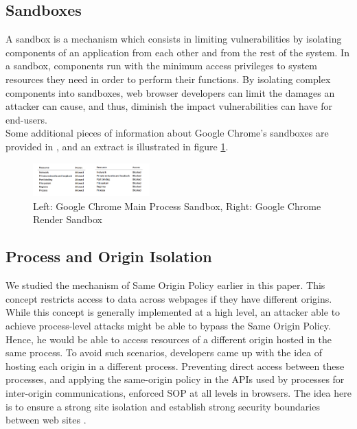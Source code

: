 \documentclass[journal]{IEEEtran}
\begin{document}
\subsection{Sandboxes}

A sandbox is a mechanism which consists in limiting vulnerabilities by isolating components of an application from each other and from the rest of the system. In a sandbox, components run with the minimum access privileges to system resources they need in order to perform their functions.
By isolating complex components into sandboxes, web browser developers can limit the damages an attacker can cause, and thus, diminish the impact vulnerabilities can have for end-users. \\

Some additional pieces of information about Google Chrome's sandboxes are provided in \cite{browserSecurityWhitePaper}, and an extract is illustrated in figure \ref{fig:ChromeSandboxes}.

\begin{figure}[h]
\centering
\includegraphics[width=0.4\textwidth]{images/SandboxesChrome.png}
\caption{Left: Google Chrome Main Process Sandbox, Right: Google Chrome Render Sandbox}
\label{fig:ChromeSandboxes}
\end{figure}

\subsection{Process and Origin Isolation}

We studied the mechanism of Same Origin Policy earlier in this paper. This concept restricts access to data across webpages if they have different origins.
While this concept is generally implemented at a high level, an attacker able to achieve process-level attacks might be able to bypass the Same Origin Policy. Hence, he would be able to access resources of a different origin hosted in the same process.
To avoid such scenarios, developers came up with the idea of hosting each origin in a different process. Preventing direct access between these processes, and applying the same-origin policy in the APIs used by processes for inter-origin communications, enforced SOP at all levels in browsers. The idea here is to ensure a strong site isolation and establish strong security boundaries between web sites \cite{isolationChrome}.
\end{document}
